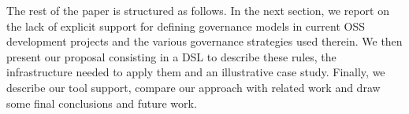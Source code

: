The rest of the paper is structured as follows. In the next section, we report on the lack of explicit support for defining governance models in current OSS development projects and the various governance strategies used therein. We then present our proposal consisting in a DSL to describe these rules, the infrastructure needed to apply them and an illustrative case study. Finally, we describe our tool support, compare our approach with related work and draw some final conclusions and future work.



